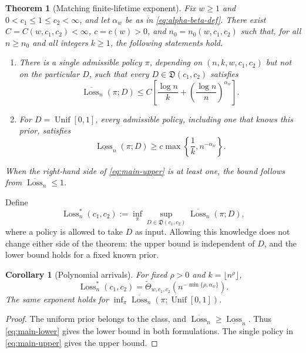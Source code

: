 \documentclass[11pt,letterpaper]{article}
\numberwithin{equation}{section}
\newtheorem{theorem}{Theorem}[section]
\newtheorem{corollary}[corollary]{Corollary}
\theoremstyle{definition}
\theoremstyle{remark}
\newcommand{\1}{\mathbf{1}}
\newcommand{\Loss}{\operatorname{Loss}}
\newcommand{\wtTheta}{\widetilde{\Theta}}
\newcommand{\Unif}{\operatorname{Unif}}
\begin{document}
\begin{theorem}[Matching finite-lifetime exponent]\label{thm:main}
Fix $w\ge1$ and $0<c_1\le1\le c_2<\infty$, and let $\alpha_w$
be as in \cref{eq:alpha-beta-def}. There exist
$C=C(w,c_1,c_2)<\infty$, $c=c(w)>0$, and
$n_0=n_0(w,c_1,c_2)$ such that, for all $n\ge n_0$ and all
integers $k\ge1$, the following statements hold.
\begin{enumerate}[label=(\roman*),leftmargin=2.2em]
  \item There is a single admissible policy $\pi$, depending on
  $(n,k,w,c_1,c_2)$ but not on the particular $D$, such that every
  $D\in\mathfrak D(c_1,c_2)$ satisfies
  \begin{equation}\label{eq:main-upper}
    \overline{\Loss}_n(\pi;D)
    \le C\left[
      \frac{\log n}{k}
      +\left(\frac{\log n}{n}\right)^{\alpha_w}
    \right].
  \end{equation}
  \item For $D=\Unif[0,1]$, every admissible policy, including one
  that knows this prior, satisfies
  \begin{equation}\label{eq:main-lower}
    \underline{\Loss}_n(\pi;D)
    \ge c\max\left\{\frac1k,n^{-\alpha_w}\right\}.
  \end{equation}
\end{enumerate}
When the right-hand side of \cref{eq:main-upper} is at least one,
the bound follows from $\overline{\Loss}_n\le1$.
\end{theorem}

Define
\[
  \Loss_n^*(c_1,c_2)
  :=\inf_\pi\sup_{D\in\mathfrak D(c_1,c_2)}
          \overline{\Loss}_n(\pi;D),
\]
where a policy is allowed to take $D$ as input. Allowing this knowledge
does not change either side of the theorem: the upper bound is
independent of $D$, and the lower bound holds for a fixed known prior.

\begin{corollary}[Polynomial arrivals]\label{cor:rho}
For fixed $\rho>0$ and $k=\lfloor n^\rho\rfloor$,
\[
  \Loss_n^*(c_1,c_2)
  =\wtTheta_{w,c_1,c_2}\!
    \left(n^{-\min\{\rho,\alpha_w\}}\right).
\]
The same exponent holds for
$\inf_\pi\overline{\Loss}_n(\pi;\Unif[0,1])$.
\end{corollary}

\begin{proof}
The uniform prior belongs to the class, and
$\overline{\Loss}_n\ge\underline{\Loss}_n$. Thus
\cref{eq:main-lower} gives the lower bound in both formulations.
The single policy in \cref{eq:main-upper} gives the upper bound.
\end{proof}
\end{document}
